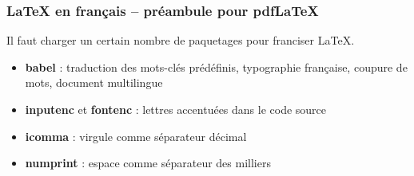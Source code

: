 \begin{frame}[fragile]

	\frametitle{{\LaTeX} en français -- préambule pour pdf\LaTeX}
	
	Il faut charger un certain nombre de paquetages pour franciser {\LaTeX}.
	
	\begin{codesource}
	\documentclass[french]{memoir}
	\usepackage{babel}
	\usepackage[autolanguage]{numprint}
	\usepackage[utf8]{inputenc}
	\usepackage[T1]{fontenc}
	\usepackage{icomma}
	\end{codesource}

	\pause
	
	\begin{itemize}
		\item \textbf{babel} : traduction des mots-clés prédéfinis, typographie française, coupure de mots, document multilingue
		
		\pause
		
		\item \textbf{inputenc} et \textbf{fontenc} : lettres accentuées dans le code source
		
		\pause
		
		\item \textbf{icomma} : virgule comme séparateur décimal
		
		\pause
		
		\item \textbf{numprint} : espace comme séparateur des milliers
	\end{itemize}
\end{frame}